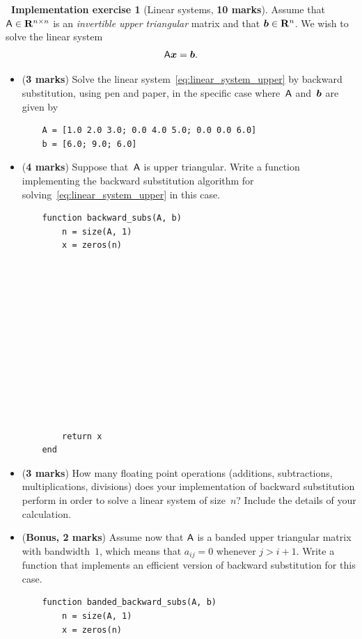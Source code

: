 \documentclass[10pt]{article}
\theoremstyle{definition}
\newtheorem{compexercise}{{\normalfont \faLaptop}~Implementation exercise}
\renewcommand{\mymarks}[1]{\textbf{#1 marks}}
\begin{document}
\newpage
\begin{compexercise}
    [Linear systems, \mymarks{10}]
    Assume that $\mathsf A \in \mathbf R^{n \times n}$ is an \emph{invertible upper triangular} matrix and that $\mathbf{\boldsymbol{b}} \in \mathbf R^n$.
    We wish to solve the linear system
    \begin{equation}
        \label{eq:linear_system_upper}
        \mathsf A \mathbf{\boldsymbol{x}} = \mathbf{\boldsymbol{b}}.
    \end{equation}
    \begin{itemize}
        \item
            (\mymarks{3})
            Solve the linear system~\eqref{eq:linear_system_upper} by backward substitution,
            using pen and paper, in the specific case where~$\mathsf A$ and~$\mathbf{\boldsymbol{b}}$ are given by
            \begin{verbatim}
    A = [1.0 2.0 3.0; 0.0 4.0 5.0; 0.0 0.0 6.0]
    b = [6.0; 9.0; 6.0]
            \end{verbatim}
            \vspace{6cm}
        \item
            (\mymarks{4})
            Suppose that~$\mathsf A$ is upper triangular.
            Write a function  implementing the backward substitution algorithm for solving~\eqref{eq:linear_system_upper} in this case.
            \begin{verbatim}
    function backward_subs(A, b)
        n = size(A, 1)
        x = zeros(n)













        return x
    end
            \end{verbatim}

        \item
            (\mymarks{3})
            How many floating point operations (additions, subtractions, multiplications, divisions) does your implementation of backward substitution perform in order to solve a linear system of size~$n$?
            Include the details of your calculation.

            \vspace{5cm}

        \item
            (\textbf{Bonus, 2 marks})
            Assume now that $\mathsf A$ is a banded upper triangular matrix with bandwidth~$1$,
            which means that $a_{ij} = 0$ whenever $j > i + 1$.
            Write a function  that implements an efficient version of backward substitution for this case.
            \begin{verbatim}
    function banded_backward_subs(A, b)
        n = size(A, 1)
        x = zeros(n)

















\end{verbatim}
\end{itemize}
\end{compexercise}
\end{document}
